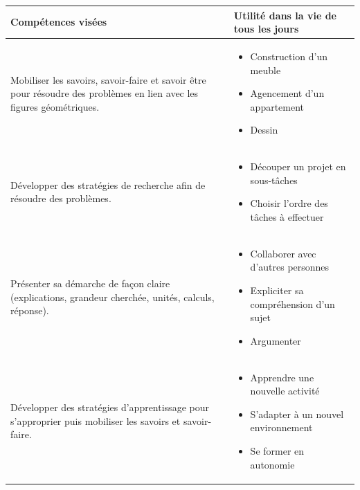\def\arraystretch{1.6}
\begin{tabularx}{\textwidth}{|>{\raggedright\arraybackslash}X|>{\raggedright\arraybackslash}X|}
\hline
\cellcolor{themeColor!30}Compétences visées & \cellcolor{themeColor!30}Utilité dans la vie de tous les jours \\
\hline
Mobiliser les savoirs, savoir-faire et savoir être pour résoudre des problèmes en lien avec les figures géométriques.
&\vspace{-1em}
\begin{itemize}[leftmargin=*, itemsep=2pt, topsep=0pt, partopsep=0pt, parsep=0pt, label=$\triangleright$]
    \item Construction d'un meuble
    \item Agencement d'un appartement
    \item Dessin
\end{itemize} \\
\hline

Développer des stratégies de recherche afin de résoudre des problèmes.
&\vspace{-1em}
\begin{itemize}[leftmargin=*, itemsep=2pt, topsep=0pt, label=$\triangleright$]
    \item Découper un projet en sous-tâches
    \item Choisir l'ordre des tâches à effectuer
\end{itemize} \\
\hline

Présenter sa démarche de façon claire (explications, grandeur cherchée, unités, calculs, réponse).
&\vspace{-1em}
\begin{itemize}[leftmargin=*, itemsep=2pt, topsep=0pt, label=$\triangleright$]
    \item Collaborer avec d'autres personnes
    \item Expliciter sa compréhension d'un sujet
    \item Argumenter
\end{itemize} \\
\hline

Développer des stratégies d'apprentissage pour s'approprier puis mobiliser les savoirs et savoir-faire.
&\vspace{-1em}
\begin{itemize}[leftmargin=*, itemsep=2pt, topsep=0pt, label=$\triangleright$]
    \item Apprendre une nouvelle activité %
    \item S'adapter à un nouvel environnement %
    \item Se former en autonomie %
\end{itemize} \\
\hline


\end{tabularx}
